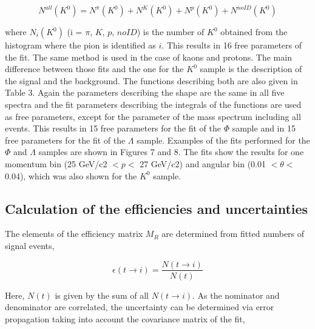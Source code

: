 \begin{equation}
  N^{all}(K^0) = N^{\pi}(K^0) + N^{K}(K^0) + N^{p}(K^0) + N^{noID}(K^0)
\end{equation}

where $N_i(K^0)$ (i = $\pi$, $K$, $p$, $noID$) is the number of $K^0$ obtained from the histogram where the pion is identified as $i$. This results in 16 free parameters of the fit.
The same method is used in the case of kaons and protons. The main difference between those fits and the one for the $K^0$ sample is the description of the signal and
the background. The functions describing both are also given in Table 3. Again the parameters describing the shape are the same in all five spectra and the fit parameters
 describing the integrals of the functions are used as free parameters, except for the parameter of the mass spectrum including all events. This results in 15 free
 parameters for the fit of the $\Phi$ sample and in 15 free parameters for the fit of the $\Lambda$ sample. Examples of the fits performed for the $\Phi$ and $\Lambda$ samples are shown in Figures
 7 and 8. The fits show the results for one momentum bin (25 GeV/c2 $< p <$ 27 GeV/c2) and angular bin (0.01 $< \theta <$ 0.04), which was also shown for the $K^0$ sample.

\subsection{Calculation of the efficiencies and uncertainties}

The elements of the efficiency matrix $M_R$ are determined from fitted numbers of signal events,

\begin{equation}
  \epsilon(t\rightarrow i) = \frac{N(t\rightarrow i)}{N(t)}
\end{equation}

Here, $N(t)$ is given by the sum of all $N(t \rightarrow i)$. As the nominator and denominator are correlated, the uncertainty can be determined via error propagation taking into
account the covariance matrix of the fit,
